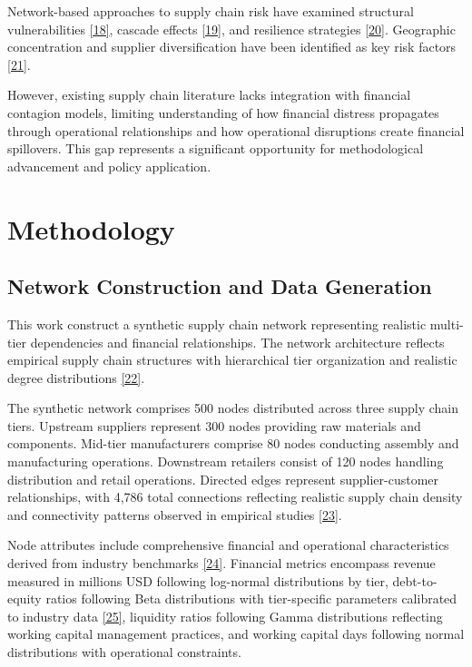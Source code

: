 \documentclass[a4 paper, 11pt,twoside]{article}
\newcommand{\0}{\Bf{0}}
\theoremstyle{definition}
\begin{document}
Network-based approaches to supply chain risk have examined structural vulnerabilities \hyperref[ref18]{[18]}, cascade effects \hyperref[ref19]{[19]}, and resilience strategies \hyperref[ref20]{[20]}. Geographic concentration and supplier diversification have been identified as key risk factors \hyperref[ref21]{[21]}.

However, existing supply chain literature lacks integration with financial contagion models, limiting understanding of how financial distress propagates through operational relationships and how operational disruptions create financial spillovers. This gap represents a significant opportunity for methodological advancement and policy application.

\section{Methodology}

\subsection{Network Construction and Data Generation}

This work construct a synthetic supply chain network representing realistic multi-tier dependencies and financial relationships. The network architecture reflects empirical supply chain structures with hierarchical tier organization and realistic degree distributions \hyperref[ref22]{[22]}.

The synthetic network comprises 500 nodes distributed across three supply chain tiers. Upstream suppliers represent 300 nodes providing raw materials and components. Mid-tier manufacturers comprise 80 nodes conducting assembly and manufacturing operations. Downstream retailers consist of 120 nodes handling distribution and retail operations. Directed edges represent supplier-customer relationships, with 4,786 total connections reflecting realistic supply chain density and connectivity patterns observed in empirical studies \hyperref[ref23]{[23]}.

Node attributes include comprehensive financial and operational characteristics derived from industry benchmarks \hyperref[ref24]{[24]}. Financial metrics encompass revenue measured in millions USD following log-normal distributions by tier, debt-to-equity ratios following Beta distributions with tier-specific parameters calibrated to industry data \hyperref[ref25]{[25]}, liquidity ratios following Gamma distributions reflecting working capital management practices, and working capital days following normal distributions with operational constraints.
\end{document}
